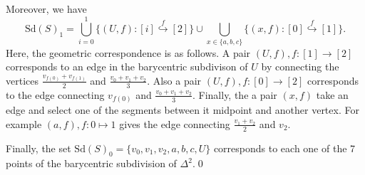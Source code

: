 Moreover, we have 
\begin{equation}
    \text{Sd}(S)_1=\bigcup_{i=0}^1\{(U,f):[i]\overset{f}{\hookrightarrow}[2]\}\cup
    \bigcup_{x\in\{a,b,c\}}\{(x,f): [0]\overset{f}{\hookrightarrow}[1]\}.
\end{equation}
Here, the geometric correspondence is as follows. A pair $(U,f),f:[1]\to [2]$ corresponds to an edge in the barycentric 
subdivison of $U$ by connecting the vertices $\tfrac{v_{f(0)}+v_{f(1)}}{2}$ and $\tfrac{v_0+v_1+v_2}{3}$. Also 
a pair $(U,f),f:[0]\to [2]$ corresponds to the edge connecting $v_{f(0)}$ and $\tfrac{v_0+v_1+v_2}{3}$. Finally, 
the a pair $(x,f)$ take an edge and select one of the segments between it midpoint and another vertex. For example 
$(a,f), f:0\mapsto 1$ gives the edge connecting $\tfrac{v_1+v_2}{2}$ and $v_2$.\par 

Finally, the set $\text{Sd}(S)_0=\{v_0,v_1,v_2, a,b,c, U\}$ corresponds to each one of the 7 points 
of the barycentric subdivision of $\Delta^2$.\qed